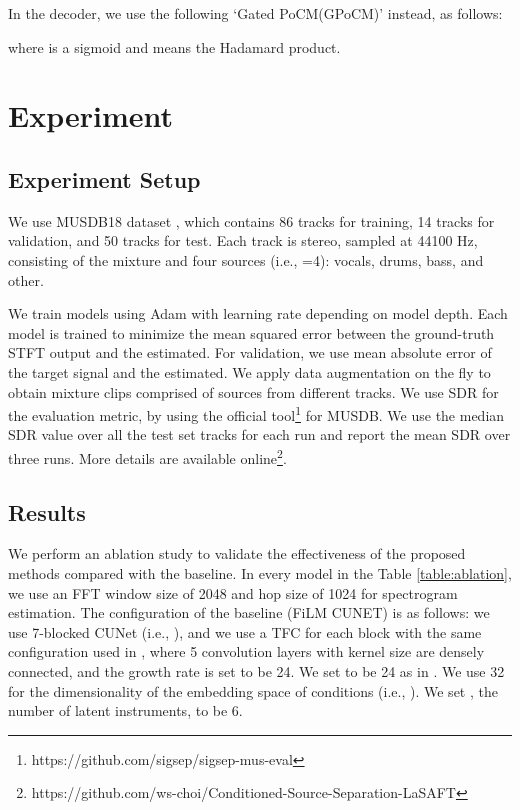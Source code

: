 \documentclass{article}
\begin{document}
In the decoder, we use the following `Gated PoCM(GPoCM)' instead, as follows: 

\noindent
where  is a sigmoid and  means the Hadamard product. 

\section{Experiment}
\label{sec:exp}

\subsection{Experiment Setup}

We use MUSDB18 dataset \cite{musdb18}, which contains 86 tracks for training, 14 tracks for validation, and 50 tracks for test. Each track is stereo, sampled at 44100 Hz, consisting of the mixture and four sources (i.e., =4): vocals, drums, bass, and other.

We train models using Adam \cite{adam} with learning rate   depending on model depth. 
Each model is trained to minimize the mean squared error between the ground-truth STFT output and the estimated.
For validation, we use mean absolute error of the target signal and the estimated. We apply data augmentation \cite{blend} on the fly to obtain mixture clips comprised of sources from different tracks.
We use SDR \cite{bss} for the evaluation metric, by using the official tool\footnote{https://github.com/sigsep/sigsep-mus-eval} for MUSDB. 
We use the median SDR value over all the test set tracks for each run and report the mean SDR over three runs.
More details are available online\footnote{https://github.com/ws-choi/Conditioned-Source-Separation-LaSAFT}.

\subsection{Results}

We perform an ablation study to validate the effectiveness of the proposed methods compared with the baseline.
In every model in the Table \ref{table:ablation}, we use an FFT window size of 2048 and hop size of 1024 for spectrogram estimation.
The configuration of the baseline (FiLM CUNET) is as follows: we use 7-blocked CUNet (i.e., ), and we use a TFC \cite{tfctdf} for each block with the same configuration used in \cite{tfctdf}, where 5 convolution layers with kernel size  are densely connected, and the growth rate \cite{densenet} is set to be 24. We set  to be 24 as in \cite{tfctdf}. We use 32 for the dimensionality of the embedding space of conditions (i.e., ). We set , the number of latent instruments, to be 6.
\end{document}
